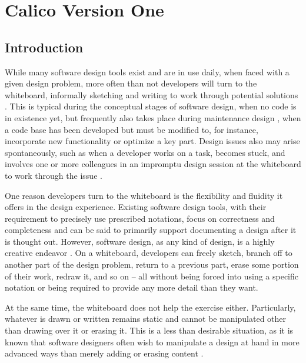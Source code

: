 \chapter{Calico Version One}
\label{chapter:calico-version-one}

\section{Introduction}
\label{intro}
While many software design tools exist and are in use daily, when faced with a given design problem, more often than not developers will turn to the whiteboard, informally sketching and writing to work through potential solutions \citep{cherubini2007let,damm2000supporting,Mangano,Nickerson,petre2009insights}. This is typical during the conceptual stages of software design, when no code is in existence yet, but frequently also takes place during maintenance design \citep{grisham}, when a code base has been developed but must be modified to, for instance, incorporate new functionality or optimize a key part. Design issues also may arise spontaneously, such as when a developer works on a task, becomes stuck, and involves one or more colleagues in an impromptu design session at the whiteboard to work through the issue \citep{cherubini2007let}.

One reason developers turn to the whiteboard is the flexibility and fluidity it offers in the design experience. Existing software design tools, with their requirement to precisely use prescribed notations, focus on correctness and completeness and can be said to primarily support documenting a design after it is thought out. However, software design, as any kind of design, is a highly creative endeavor \citep{petre2009insights,Brooks}. On a whiteboard, developers can freely sketch, branch off to another part of the design problem, return to a previous part, erase some portion of their work, redraw it, and so on – all without being forced into using a specific notation or being required to provide any more detail than they want. 

At the same time, the whiteboard does not help the exercise either. Particularly, whatever is drawn or written remains static and cannot be manipulated other than drawing over it or erasing it. This is a less than desirable situation, as it is known that software designers often wish to manipulate a design at hand in more advanced ways than merely adding or erasing content \citep{dekel2007notation}.

